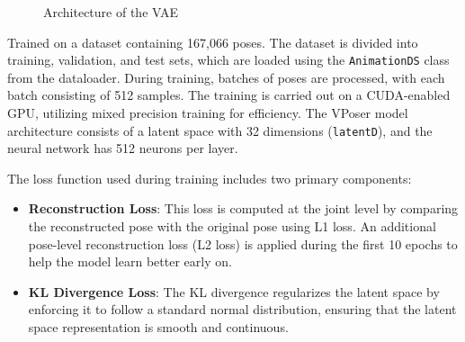 \documentclass[../../main.tex]{subfiles}
\begin{document}
\begin{figure}[h]
\caption{Architecture of the VAE}
\label{fig:vae}
\end{figure}

Trained on a dataset containing 167,066 poses. The dataset is divided into training, validation, and test sets, which are loaded using the \texttt{AnimationDS} class from the dataloader. During training, batches of poses are processed, with each batch consisting of 512 samples. The training is carried out on a CUDA-enabled GPU, utilizing mixed precision training for efficiency. The VPoser model architecture consists of a latent space with 32 dimensions (\texttt{latentD}), and the neural network has 512 neurons per layer. 

The loss function used during training includes two primary components: 
\begin{itemize}
    \item \textbf{Reconstruction Loss}: This loss is computed at the joint level by comparing the reconstructed pose with the original pose using L1 loss. An additional pose-level reconstruction loss (L2 loss) is applied during the first 10 epochs to help the model learn better early on.
    \item \textbf{KL Divergence Loss}: The KL divergence regularizes the latent space by enforcing it to follow a standard normal distribution, ensuring that the latent space representation is smooth and continuous.
\end{itemize}
\end{document}
